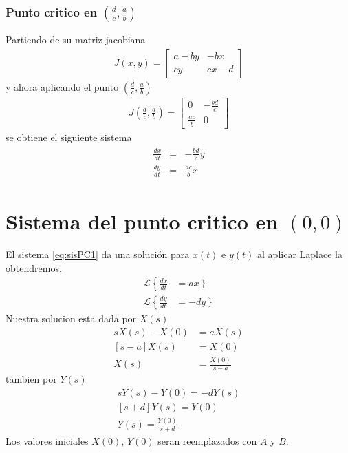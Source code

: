 \documentclass{report}
\begin{document}


\subsubsection{Punto critico en $(\frac{d}{c},\frac{a}{b})$}
Partiendo de su matriz jacobiana
\begin{align*}
J(x,y)=
\left[
\begin{matrix}
a-by &-bx\\
cy &cx-d
\end{matrix}\right]
\end{align*}
y ahora aplicando el punto $(\frac{d}{c},\frac{a}{b})$
\begin{align}
J(\frac{d}{c},\frac{a}{b})=
\left[
\begin{matrix}
0 &-\frac{bd}{c}\\
\frac{ac}{b} &0
\end{matrix}\right]
\end{align}
se obtiene el siguiente sistema
\begin{align}
\begin{array}{ccc}
\frac{dx}{dt}&= &-\frac{bd}{c}y \\
\frac{dy}{dt}&= &\frac{ac}{b}x
\end{array}\label{eq:sisPC2}
\end{align}

\section{Sistema del punto critico en $(0,0)$}
El sistema \ref{eq:sisPC1} da una solución para $x(t)$ e $y(t)$ al aplicar Laplace la obtendremos.
\begin{align*}
\mathcal{L}\left\{\frac{dx}{dt} \right.&= \left. ax\right\} \\
\mathcal{L}\left\{ \frac{dy}{dt}\right.&= \left.-dy \right\}
\end{align*}
Nuestra solucion esta dada por $X(s)$
\begin{align}
sX(s)-X(0)&=aX(s) \nonumber\\
\left[s-a\right]X(s) &=X(0) \\
X(s)&= \frac{X(0)}{s-a} \label{eq:xsLap}
\end{align}
tambien por $Y(s)$
\begin{align}
sY(s)-Y(0)=-dY(s) \nonumber \\
\left[s+d\right]Y(s)=Y(0)\nonumber \\
Y(s)=\frac{Y(0)}{s+d}
 \label{eq:ysLap}
\end{align}
Los valores iniciales $X(0)$, $Y(0)$ seran reemplazados con $A$ y $B$.
\end{document}
